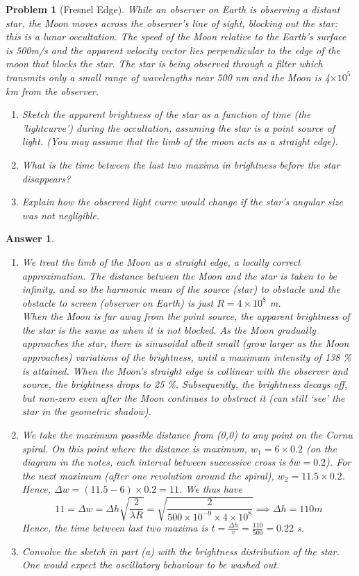 \documentclass[a4paper]{article}
\newtheorem{ans}{Answer}[section]
\theoremstyle{new}
\newtheorem{qns}{Problem}[section]
\begin{document}
\begin{qns}[Fresnel Edge]
While an observer on Earth is observing a distant star, the Moon moves across the observer’s line of sight, blocking out the star: this is a lunar occultation. The speed of the Moon relative to the Earth’s surface is 500m/s and the apparent velocity vector lies perpendicular to the edge of the moon that blocks the star. The star is being observed through a filter which transmits only a small
range of wavelengths near 500 nm and the Moon is 4$\times10^5$ km from the observer.
\begin{enumerate}[label=(\alph*)]
\item Sketch the apparent brightness of the star as a function of time (the ’lightcurve’) during the occultation, assuming the star is a point source of light. (You may assume that the limb of the moon acts as a straight edge).
\item What is the time between the last two maxima in brightness before the star disappears?
\item Explain how the observed light curve would change if the star’s angular size was not negligible.
\end{enumerate}
\end{qns}
\begin{ans}\leavevmode
\begin{enumerate}[label=(\alph*)]
\item We treat the limb of the Moon as a straight edge, a locally correct approximation. The distance between the Moon and the star is taken to be infinity, and so the harmonic mean of the source (star) to obstacle and the obstacle to screen (observer on Earth) is just $R=4\times10^8$ m.\\[5pt]
When the Moon is far away from the point source, the apparent brightness of the star is the same as when it is not blocked. As the Moon gradually approaches the star, there is sinusoidal albeit small (grow larger as the Moon approaches) variations of the brightness, until a maximum intensity of 138 \% is attained. When the Moon's straight edge is collinear with the observer and source, the brightness drops to 25 \%. Subsequently, the brightness decays off, but non-zero even after the Moon continues to obstruct it (can still `see' the star in the geometric shadow).
\item We take the maximum possible distance from (0,0) to any point on the Cornu spiral. On this point where the distance is maximum, $w_1=6\times 0.2$ (on the diagram in the notes, each interval between successive cross is $\delta w=0.2$). For the next maximum (after one revolution around the spiral), $w_2=11.5\times 0.2$. Hence, $\Delta w=(11.5-6)\times 0.2=11$. We thus have
$$11=\Delta w=\Delta h\sqrt{\frac{2}{\lambda R}}=\sqrt{\frac{2}{500\times10^{-9}\times 4\times10^8}}\implies\Delta h=110m$$
Hence, the time between last two maxima is $t=\frac{\Delta h}{v}=\frac{110}{500}=0.22$ s.
\item Convolve the sketch in part (a) with the brightness distribution of the star. One would expect the oscillatory behaviour to be washed out.
\end{enumerate}
\end{ans}
\end{document}
